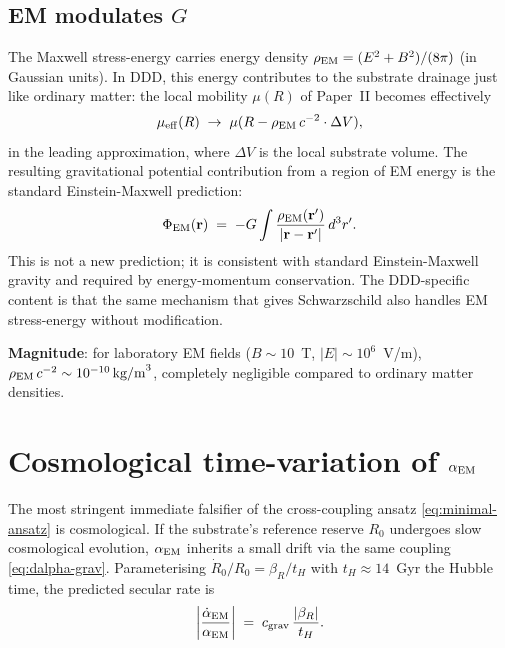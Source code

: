 \documentclass[11pt,a4paper]{article}
\begin{document}
\subsection{EM modulates $G$}

The Maxwell stress-energy carries energy density
$\rho_{\rm EM} = (E^2 + B^2)/(8\pi)$ (in Gaussian units). In
DDD, this energy contributes to the substrate drainage just
like ordinary matter: the local mobility $\mu(R)$ of Paper~II
becomes effectively
\begin{equation}
\mu_{\rm eff}(R) \;\to\; \mu(R - \rho_{\rm EM}\,c^{-2}\cdot\Delta V),
\end{equation}
in the leading approximation, where $\Delta V$ is the local
substrate volume. The resulting gravitational potential
contribution from a region of EM energy is the standard
Einstein-Maxwell prediction:
\begin{equation}
\Phi_{\rm EM}(\mathbf{r}) \;=\;
-G \int \frac{\rho_{\rm EM}(\mathbf{r}')}{|\mathbf{r} -
\mathbf{r}'|}\,d^3 r'.
\end{equation}
This is not a new prediction; it is consistent with standard
Einstein-Maxwell gravity and required by energy-momentum
conservation. The DDD-specific content is that the same
mechanism that gives Schwarzschild also handles EM stress-energy
without modification.

\textbf{Magnitude}: for laboratory EM fields ($B \sim 10$~T,
$|E| \sim 10^6$~V/m), $\rho_{\rm EM}\,c^{-2} \sim 10^{-10}\,
\text{kg/m}^3$, completely negligible compared to ordinary
matter densities.

\section{Cosmological time-variation of $\alpha_{\rm EM}$}
\label{sec:cosmo}

The most stringent immediate falsifier of the cross-coupling
ansatz \eqref{eq:minimal-ansatz} is cosmological. If the
substrate's reference reserve $R_0$ undergoes slow cosmological
evolution, $\alpha_{\rm EM}$ inherits a small drift via the same
coupling \eqref{eq:dalpha-grav}. Parameterising
$\dot R_0 / R_0 = \beta_R / t_H$ with $t_H \approx 14$~Gyr the
Hubble time, the predicted secular rate is
\begin{equation}
\left|\frac{\dot\alpha_{\rm EM}}{\alpha_{\rm EM}}\right|
\;=\; c_{\rm grav}\,\frac{|\beta_R|}{t_H}.
\label{eq:cosmo-rate}
\end{equation}
\end{document}
